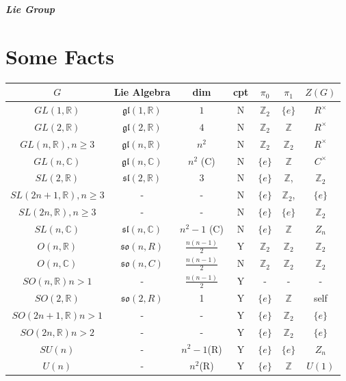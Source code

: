 \documentclass[12pt, a4paper]{article}
\theoremstyle{definition}
\theoremstyle{remark}
\newcommand{\bb}[1]{\mathbb{#1}}
\renewcommand{\emph}[1]{\textbf{\textit{#1}}}
\newcommand{\gl}{\mathfrak{gl}}
\renewcommand{\sl}{\mathfrak{sl}}
\newcommand{\mf}[1]{\mathfrak{#1}}
\begin{document}
\emph{\huge{Lie Group}}
\section{Some Facts}
\begin{table}[h]
	\centering
	\begin{tabular}{|c|c|c|c|c|c|c|}
		\hline
		$G$                                & Lie Algebra      & dim               &cpt& $\pi_0$    & $\pi_1$ & $Z(G)$\\
		\hline                                                                    
		$GL(1, \bb{R})$                    & $\gl(1, \bb{R})$ & $1$               & N & $\bb{Z}_2$ & $\{e\}$        & $R^{\times}$ \\
		$GL(2, \bb{R})$                    & $\gl(2, \bb{R})$ & $4$               & N & $\bb{Z}_2$ & $\bb{Z}$       & $R^{\times}$ \\
		$GL(n, \bb{R}), n \geq 3$          & $\gl(n, \bb{R})$ & $n^2$             & N & $\bb{Z}_2$ & $\bb{Z}_2$     & $R^{\times}$ \\
		$GL(n, \bb{C})$                    & $\gl(n, \bb{C})$ & $n^2$ (C)         & N & $\{e\}$    & $\bb{Z}$       & $C^{\times}$ \\
		$SL(2, \bb{R})$                    & $\sl(2, \bb{R})$ & $3$               & N & $\{e\}$    & $\bb{Z}$,      & $\bb{Z}_2$ \\
		$SL(2n + 1, \bb{R}), n \geq 3$     & -                & -                 & N & $\{e\}$    & $\bb{Z}_2 $,   & $\{e\}$ \\
		$SL(2n,\bb{R}), n \geq 3$          & -                & -                 & N & $\{e\}$    & $\{e\}$        & $\bb{Z}_2$ \\
		$SL(n, \bb{C})$                    & $\sl(n, \bb{C})$ & $n^2-1$ (C)       & N & $\{e\}$    & $\bb{Z}$       & $Z_n$ \\
		$O(n, \bb{R})$                     &  $\mf{so}(n, R)$ &$\frac{n(n-1)}{2}$ & Y & $\bb{Z}_2$ & $\bb{Z}_2$     & $\bb{Z}_2$  \\
		$O(n, \bb{C})$                     & $\mf{so}(n, C)$  &$\frac{n(n-1)}{2}$ & N & $\bb{Z}_2$ & $\bb{Z}_2$     & $\bb{Z}_2$  \\
		$SO(n, \bb{R}) n > 1$              &  -               &$\frac{n(n-1)}{2}$ & Y & - & -& - \\
		$SO(2, \bb{R})$                    & $\mf{so}(2, R)$  &1                  & Y & $\{e\}$    & $\bb{Z}$       & self \\
		$SO(2n+1, \bb{R}) n > 1$           &  -               &                -  & Y & $\{e\}$    & $\bb{Z}_2$     & $\{e\}$\\
		$SO(2n, \bb{R}) n > 2$             &                - &                -  & Y & $\{e\}$    & $\bb{Z}_2$     & $\{e\}$\\
		$SU(n) $                           &                - &$n^2-1$(R)           & Y & $\{e\}$    &$\{e\}$         & $Z_n$\\
		$U(n) $                            &                - &$n^2$(R)             & Y & $\{e\}$    & $\bb{Z}$       & $U(1)$\\
		\hline
	\end{tabular}
\end{table}
\end{document}
